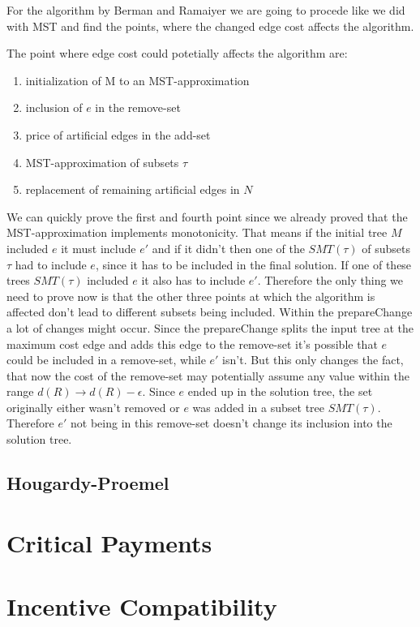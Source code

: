 For the algorithm by Berman and Ramaiyer we are going to procede like we did with MST and find the points, where the changed edge cost affects the algorithm.

The point where edge cost could potetially affects the algorithm are:
\begin{enumerate}
\item initialization of M to an MST-approximation
\item inclusion of $e$ in the remove-set
\item price of artificial edges in the add-set
\item MST-approximation of subsets $\tau$
\item replacement of remaining artificial edges in $N$
\end{enumerate}

We can quickly prove the first and fourth point since we already proved that the MST-approximation implements monotonicity. That means if the initial tree $M$ included $e$ it must include $e'$ and if it didn't then one of the $SMT(\tau)$ of subsets $\tau$ had to include $e$, since it has to be included in the final solution. If one of these trees $SMT(\tau)$ included $e$ it also has to include $e'$. Therefore the only thing we need to prove now is that the other three points at which the algorithm is affected don't lead to different subsets being included. 
Within the prepareChange a lot of changes might occur. Since the prepareChange splits the input tree at the maximum cost edge and adds this edge to the remove-set it's possible that $e$ could be included in a remove-set, while $e'$ isn't. But this only changes the fact, that now the cost of the remove-set may potentially assume any value within the range $d(R) \to d(R)-\epsilon$. Since $e$ ended up in the solution tree, the set originally either wasn't removed or $e$ was added in a subset tree $SMT(\tau)$. Therefore $e'$ not being in this remove-set doesn't change its inclusion into the solution tree.  


\subsection{Hougardy-Proemel}

\section{Critical Payments}
\section{Incentive Compatibility}

